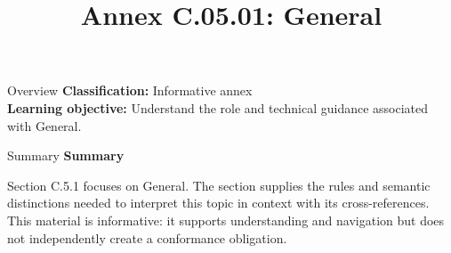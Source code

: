 \documentclass[10pt,letterpaper]{article}
\title{Annex C.05.01: General}
\author{}
\date{}
\begin{document}
\maketitle
\begin{CornellOverviewBox}{Overview}
\textbf{Classification:} Informative annex\\[2pt]
\textbf{Learning objective:} Understand the role and technical guidance associated with General.
\end{CornellOverviewBox}\begin{CornellSummaryBox}{Summary}
{\sffamily\bfseries\color{Accent} Summary}\par\vspace{3pt}Section C.5.1 focuses on General. The section supplies the rules and semantic distinctions needed to interpret this topic in context with its cross-references. This material is informative: it supports understanding and navigation but does not independently create a conformance obligation.
\end{CornellSummaryBox}
\end{document}
